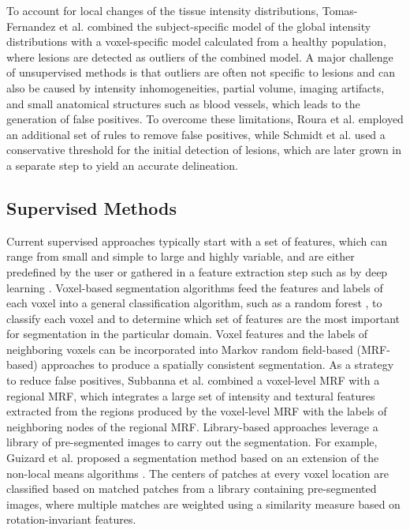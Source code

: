 To account for local changes of the tissue intensity distributions,
Tomas-Fernandez et al. \cite{tomas2015} combined the subject-specific model of
the global intensity distributions with a voxel-specific model calculated from a
healthy population, where lesions are detected as outliers of the combined
model. A major challenge of unsupervised methods is that outliers are often not
specific to lesions and can also be caused by intensity inhomogeneities, partial
volume, imaging artifacts, and small anatomical structures such as blood
vessels, which leads to the generation of false positives. To overcome these
limitations, Roura et al. \cite{roura2015} employed an additional set of rules
to remove false positives, while Schmidt et al. \cite{schmidt2012automated} used
a conservative threshold for the initial detection of lesions, which are later
grown in a separate step to yield an accurate delineation.

\subsection{Supervised Methods}

Current supervised approaches typically start with a set of features, which can
range from small and simple to large and highly variable, and are either predefined
by the user \cite{geremia2010,guizard2015,subbanna2015} or gathered in a feature
extraction step such as by deep learning \cite{yoo2014}. Voxel-based
segmentation algorithms \cite{geremia2010,yoo2014} feed the features and labels
of each voxel into a general classification algorithm, such as a random forest
\cite{breiman2001}, to classify each voxel and to determine which set of
features are the most important for segmentation in the particular domain.
Voxel features and the labels of neighboring voxels can be incorporated into
Markov random field-based (MRF-based) approaches
\cite{subbanna2009,subbanna2015} to produce a spatially consistent segmentation.
As a strategy to reduce false positives, Subbanna et al.
\cite{subbanna2015} combined a voxel-level MRF with a regional MRF, which
integrates a large set of intensity and textural features extracted from the
regions produced by the voxel-level MRF with the labels of neighboring nodes of
the regional MRF.
Library-based approaches leverage a library of pre-segmented images to carry out
the segmentation. For example, Guizard et al.
\cite{guizard2015} proposed a segmentation method based on an extension of the
non-local means algorithms \cite{coupe2011}. The centers of patches at every
voxel location are classified based on matched patches from a library containing
pre-segmented images, where multiple matches are weighted using a similarity
measure based on rotation-invariant features.

